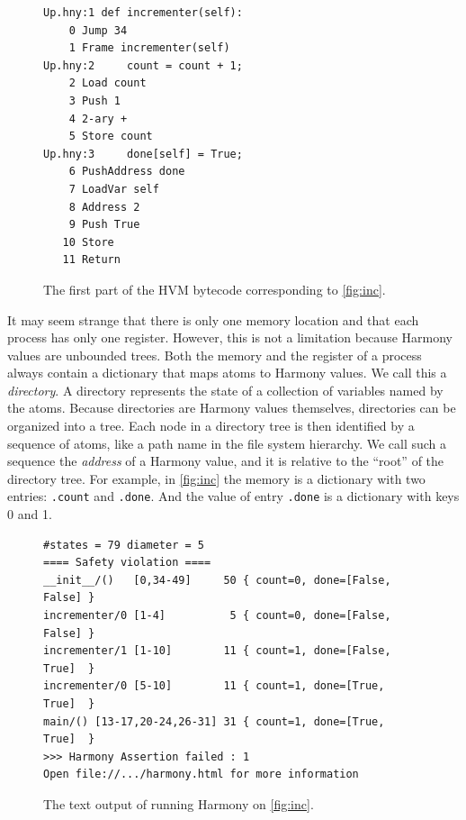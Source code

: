 \documentclass{report}
\newenvironment{code}{
\tcolorbox
}{
\endtcolorbox
}
\begin{document}
\begin{figure}
\begin{code}
\begin{verbatim}
Up.hny:1 def incrementer(self):
    0 Jump 34
    1 Frame incrementer(self)
Up.hny:2     count = count + 1;
    2 Load count
    3 Push 1
    4 2-ary +
    5 Store count
Up.hny:3     done[self] = True;
    6 PushAddress done
    7 LoadVar self
    8 Address 2
    9 Push True
   10 Store
   11 Return
\end{verbatim}
\end{code}
\caption{The first part of the HVM bytecode corresponding to \autoref{fig:inc}.}
\label{fig:inccode}
\end{figure}

It may seem strange that there is only one memory location and that each
process has only one register.  However, this is not a limitation because
Harmony values are unbounded trees.
Both the memory and the register of a process always contain
a dictionary that maps atoms to Harmony values.  We call this a \emph{directory}.
%
A directory represents the state of a collection of variables named by the atoms.
%
Because directories are Harmony values themselves,
directories can be organized into a tree.
Each node in a directory tree is then identified
by a sequence of atoms, like a path name in the file system hierarchy.  We call
such a sequence the \emph{address}
%
of a Harmony value, and it is relative to the
``root'' of the directory tree.
For example, in \autoref{fig:inc} the memory is a dictionary with two
entries: \texttt{.count} and \texttt{.done}.  And the value of entry
\texttt{.done} is a dictionary with keys 0 and 1.

\begin{figure}
\begin{code}
\begin{verbatim}
#states = 79 diameter = 5
==== Safety violation ====
__init__/()   [0,34-49]     50 { count=0, done=[False, False] }
incrementer/0 [1-4]          5 { count=0, done=[False, False] }
incrementer/1 [1-10]        11 { count=1, done=[False, True]  }
incrementer/0 [5-10]        11 { count=1, done=[True,  True]  }
main/() [13-17,20-24,26-31] 31 { count=1, done=[True,  True]  }
>>> Harmony Assertion failed : 1
Open file://.../harmony.html for more information
\end{verbatim}
\end{code}
\caption{The text output of running Harmony on \autoref{fig:inc}.}
\label{fig:incoutput}
\end{figure}
\end{document}

